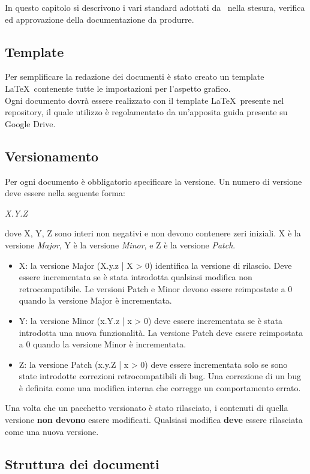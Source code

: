 In questo capitolo si descrivono i vari standard adottati da \GRUPPO\ nella stesura, verifica ed approvazione della documentazione da produrre.
\subsection{Template}
Per semplificare la redazione dei documenti è stato creato un \gls{template} \LaTeX\ contenente tutte le impostazioni per l'aspetto grafico. \\
Ogni documento dovrà essere realizzato con il \gls{template} \LaTeX\ presente nel \gls{repository}, il quale utilizzo è regolamentato da un'apposita guida presente su \gls{Google Drive}.
\subsection{Versionamento}
Per ogni documento è obbligatorio specificare la versione. Un numero di versione deve essere nella seguente forma:
\begin{center}
	\emph{X.Y.Z}
\end{center}
dove X, Y, Z sono interi non negativi e non devono contenere zeri iniziali. X è la versione \textit{Major}, Y è la versione \textit{Minor}, e Z è la versione \textit{Patch}.
\begin{itemize}
	\item X: la versione Major (X.y.z | X > 0) identifica la versione di rilascio. Deve essere incrementata se è stata introdotta qualsiasi modifica non retrocompatibile. Le versioni Patch e Minor devono essere reimpostate a 0 quando la versione Major è incrementata. 
	\item Y: la versione Minor (x.Y.z | x > 0) deve essere incrementata se è stata introdotta una nuova funzionalità. La versione Patch deve essere reimpostata a 0 quando la versione Minor è incrementata.
	\item Z: la versione Patch (x.y.Z | x > 0) deve essere incrementata solo se sono state introdotte correzioni retrocompatibili di bug. Una correzione di un bug è definita come una modifica interna che corregge un comportamento errato.
\end{itemize}
Una volta che un pacchetto versionato è stato rilasciato, i contenuti di quella versione \textbf{non devono} essere modificati. Qualsiasi modifica \textbf{deve} essere rilasciata come una nuova versione.

\subsection{Struttura dei documenti}
